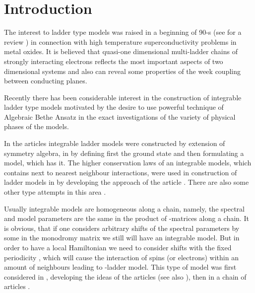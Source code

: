 \documentclass[a4paper,12pt]{article}
\begin{document}
\vfill
{}

\newpage
\pagestyle{plain}
\setcounter{page}{1}

\section{Introduction}
\indent

The interest to ladder type models was raised in a beginning of
90-s (see for a review \cite{Rice}) in connection with high
temperature superconductivity problems in metal oxides. It is
believed that quasi-one dimensional multi-ladder chains of
strongly interacting electrons reflects the most important
aspects of two dimensional systems and also can reveal some 
properties of the week coupling between conducting planes.

Recently there has been considerable interest in the construction
of integrable ladder type models motivated by the desire to use
powerful technique of Algebraic Bethe Ansatz \coordHE{} \cite{Bax,FT} 
in the exact investigations of the variety of physical phases
of the models.

In the articles \cite{Wa} integrable ladder models were
constructed by extension of symmetry algebra, in \cite{Ko}
by defining first the ground state and then formulating a model,
which has it. The higher conservation laws of an integrable models,
which contains next to nearest neighbour interactions, were
used in construction of ladder models in \cite{Muu} by developing
the approach of the article \cite{Maj}. There are also some other 
type attempts in this area \cite{Al,For}.

Usually integrable models are homogeneous along a chain, namely,
the spectral \coordHE{} and model parameters are the same in the
product of \coordHE{}-matrices along a chain. It is obvious, that if one 
considers arbitrary shifts of the spectral parameters by
some \coordHE{} in the monodromy matrix we still will have an integrable
model. But in order to have a local Hamiltonian we need to consider
shifts with the fixed periodicity \coordHE{}, which will cause the
interaction of spins (or electrons) within an amount of \coordHE{} neighbours
leading to \coordHE{}-ladder model. This type of model was first
considered in \cite{Destri}, developing the ideas
of the articles \cite{Resh} (see also \cite{FLec}), then in a
chain of articles \cite{ZV,ZV1, FR}.
\end{document}
